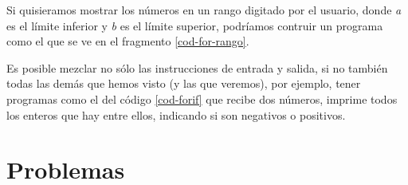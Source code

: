 Si quisieramos mostrar los números en un rango digitado por el usuario, donde \emph{a} es el límite inferior y \emph{b} es el límite superior, podríamos contruir un programa como el que se ve en el fragmento \ref{cod-for-rango}.



Es posible mezclar no sólo las instrucciones de entrada y salida, si no también todas las demás que hemos visto (y las que veremos), por ejemplo, tener programas como el del código \ref{cod-forif} que recibe dos números, imprime todos los enteros que hay entre ellos, indicando si son negativos o positivos. \\






\section{Problemas}



\newpage
